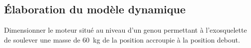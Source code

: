 \documentclass[10pt,fleqn]{article} %
\begin{document}
\begin{multicols}{2}
%
%
%
%


\subsection*{Élaboration du modèle dynamique}

\begin{obj}
Dimensionner le moteur situé au niveau d’un genou permettant à l’exosquelette de soulever une masse de \SI{60}{kg} de la position accroupie à la position debout.
\end{obj}


\end{multicols}
\end{document}

